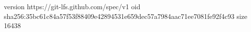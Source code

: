 version https://git-lfs.github.com/spec/v1
oid sha256:35bc61c84a57f53f88409e42894531e659dec57a7984aac71ee7081fe92f4c93
size 16438
